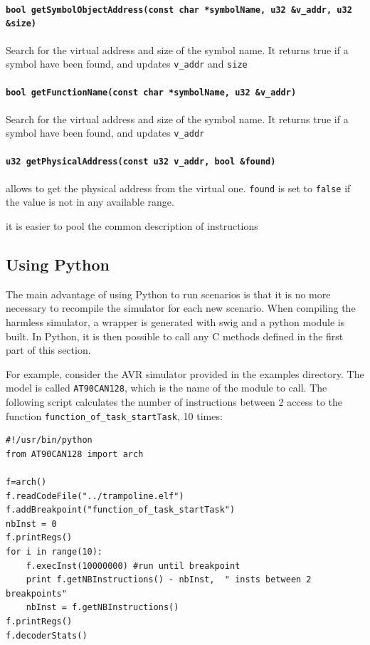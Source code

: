\paragraph{\texttt{bool getSymbolObjectAddress(const char *symbolName, u32 \&v\_addr, u32 \&size)}} Search for the virtual address and size of the symbol name. It returns true if a symbol have been found, and updates \texttt{v\_addr} and \texttt{size}
\paragraph{\texttt{bool getFunctionName(const char *symbolName, u32 \&v\_addr)}} Search for the virtual address and size of the symbol name. It returns true if a symbol have been found, and updates \texttt{v\_addr}

\paragraph{\texttt{u32 getPhysicalAddress(const u32 v\_addr, bool \&found)}}  allows to get the physical address from the virtual one. \texttt{found} is set to \texttt{false} if the value is not in any available range.

it is easier to pool the common description of instructions

\subsection{Using Python}
\label{sec:python}
The main advantage of using Python to run scenarios is that it is no more necessary to recompile the simulator for each new scenario. When compiling the harmless simulator, a wrapper is generated with swig and a python module is built. In Python, it is then possible to call any C methods defined in the first part of this section.

For example, consider the AVR simulator provided in the examples directory. The model is called \texttt{AT90CAN128}, which is the name of the module to call. The following script calculates the number of instructions between 2 access to the function \texttt{function\_of\_task\_startTask}, 10 times:

\lstset{language=Python}
\begin{lstlisting}
#!/usr/bin/python
from AT90CAN128 import arch

f=arch()
f.readCodeFile("../trampoline.elf")
f.addBreakpoint("function_of_task_startTask")
nbInst = 0
f.printRegs()
for i in range(10):
    f.execInst(10000000) #run until breakpoint
    print f.getNBInstructions() - nbInst,  " insts between 2 breakpoints"
    nbInst = f.getNBInstructions()
f.printRegs()
f.decoderStats()
\end{lstlisting}
\lstset{language=Harmless}
